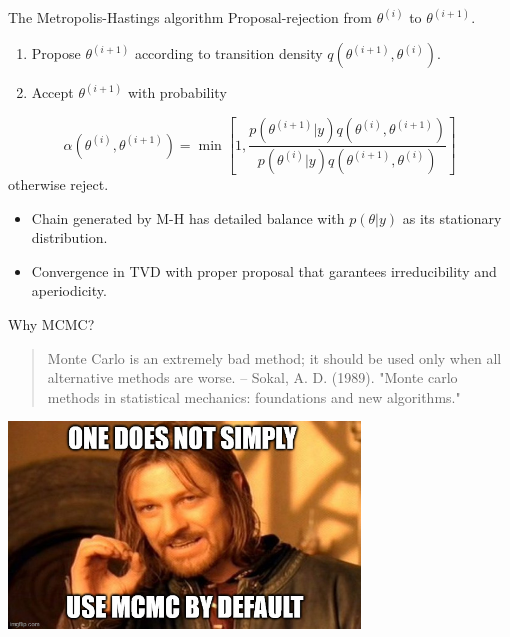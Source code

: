 \documentclass[bigger]{beamer}
\begin{document}
\begin{frame}[label={sec:org8b4e383}]{The Metropolis-Hastings algorithm}
Proposal-rejection from \(\theta^{(i)}\) to \(\theta^{(i+1)}\).
\begin{enumerate}
\item Propose \(\theta^{(i+1)}\) according to transition density \(q(\theta^{(i+1)}, \theta^{(i)})\).
\item Accept \(\theta^{(i+1)}\) with probability
\end{enumerate}
\begin{equation}
  \alpha(\theta^{(i)}, \theta^{(i+1)}) = \min\left[
    1, \frac{p(\theta^{(i+1)}|y)q(\theta^{(i)}, \theta^{(i+1)})}{p(\theta^{(i)}|y)q(\theta^{(i+1)}, \theta^{(i)})}
    \right]
\end{equation}
otherwise reject.

\begin{itemize}
\item Chain generated by M-H has detailed balance with \(p(\theta|y)\) as
its stationary distribution.
\item Convergence in TVD with proper proposal that garantees irreducibility and aperiodicity.
\end{itemize}
\end{frame}

\begin{frame}[label={sec:org1713aa2}]{Why MCMC?}
\begin{quote}
Monte Carlo is an extremely bad method; it should be used only when all alternative methods
are worse.
-- Sokal, A. D. (1989). "Monte carlo methods in statistical mechanics: foundations and new algorithms."
\end{quote}
\begin{center}
\includegraphics[width=0.7\textwidth]{./figure/simply_not_mcmc.jpg}
\end{center}
\end{frame}
\end{document}
